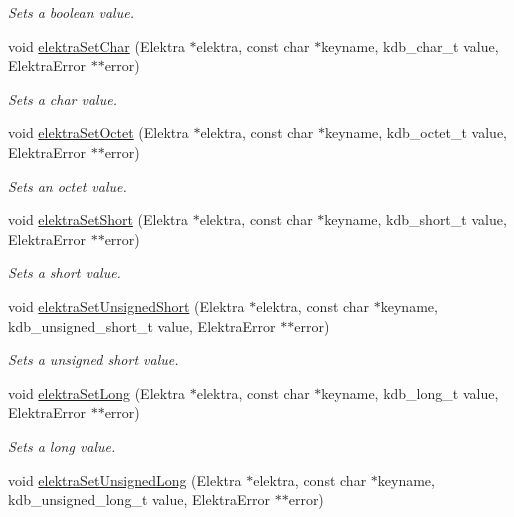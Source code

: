 \begin{DoxyCompactItemize}
\begin{DoxyCompactList}\small\item\em Sets a boolean value. \end{DoxyCompactList}\item 
void \mbox{\hyperlink{group__highlevel_ga5e00b3685b0ec462a4f377481b786787}{elektra\+Set\+Char}} (Elektra $\ast$elektra, const char $\ast$keyname, kdb\+\_\+char\+\_\+t value, Elektra\+Error $\ast$$\ast$error)
\begin{DoxyCompactList}\small\item\em Sets a char value. \end{DoxyCompactList}\item 
void \mbox{\hyperlink{group__highlevel_ga8ad9e3df6cf7868a38604d29122f4e21}{elektra\+Set\+Octet}} (Elektra $\ast$elektra, const char $\ast$keyname, kdb\+\_\+octet\+\_\+t value, Elektra\+Error $\ast$$\ast$error)
\begin{DoxyCompactList}\small\item\em Sets an octet value. \end{DoxyCompactList}\item 
void \mbox{\hyperlink{group__highlevel_ga067b1785a444fd98349e0e2b9f43ce3e}{elektra\+Set\+Short}} (Elektra $\ast$elektra, const char $\ast$keyname, kdb\+\_\+short\+\_\+t value, Elektra\+Error $\ast$$\ast$error)
\begin{DoxyCompactList}\small\item\em Sets a short value. \end{DoxyCompactList}\item 
void \mbox{\hyperlink{group__highlevel_gaf2e211a564bd082715e3256ceaf5e1c3}{elektra\+Set\+Unsigned\+Short}} (Elektra $\ast$elektra, const char $\ast$keyname, kdb\+\_\+unsigned\+\_\+short\+\_\+t value, Elektra\+Error $\ast$$\ast$error)
\begin{DoxyCompactList}\small\item\em Sets a unsigned short value. \end{DoxyCompactList}\item 
void \mbox{\hyperlink{group__highlevel_gaf2564ca6e0e4440359074a0b59a02344}{elektra\+Set\+Long}} (Elektra $\ast$elektra, const char $\ast$keyname, kdb\+\_\+long\+\_\+t value, Elektra\+Error $\ast$$\ast$error)
\begin{DoxyCompactList}\small\item\em Sets a long value. \end{DoxyCompactList}\item 
void \mbox{\hyperlink{group__highlevel_ga7f0fef70748854e222db829050079136}{elektra\+Set\+Unsigned\+Long}} (Elektra $\ast$elektra, const char $\ast$keyname, kdb\+\_\+unsigned\+\_\+long\+\_\+t value, Elektra\+Error $\ast$$\ast$error)

\end{DoxyCompactItemize}
